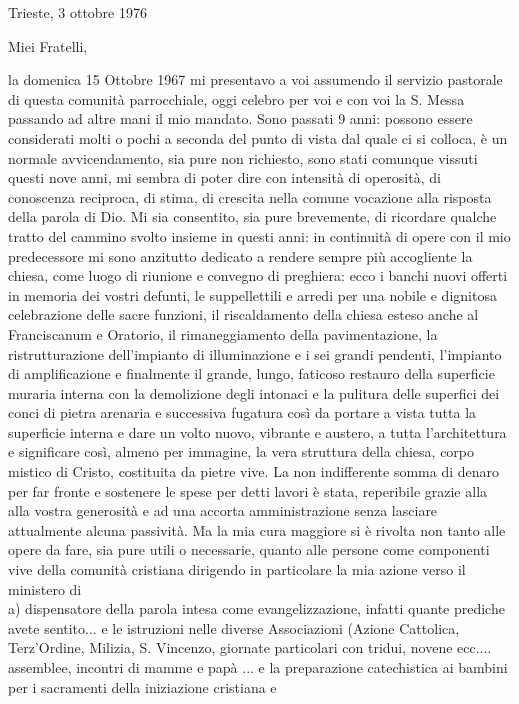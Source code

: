 \begin{flushright}
Trieste, 3 ottobre 1976
\end{flushright}
Miei Fratelli,\par
la domenica 15 Ottobre 1967 mi presentavo a voi assumendo il servizio pastorale di questa comunità parrocchiale, oggi celebro per voi e con voi la S. Messa passando ad altre mani il mio mandato.
Sono passati 9 anni: possono essere considerati molti o pochi a seconda del punto di vista dal quale ci si colloca, è un normale avvicendamento, sia pure non richiesto, sono stati comunque vissuti 
questi nove anni, mi sembra di poter dire con intensità di operosità, di conoscenza reciproca, di stima, di crescita nella comune vocazione alla risposta della parola di Dio.
Mi sia consentito, sia pure brevemente, di ricordare qualche tratto del cammino svolto insieme in questi anni:
in continuità di opere con il mio predecessore mi sono anzitutto dedicato a rendere sempre più accogliente la chiesa, come luogo di riunione e convegno di preghiera: 
ecco i banchi nuovi offerti in memoria dei vostri defunti, le suppellettili e arredi per una nobile e dignitosa celebrazione delle sacre funzioni, il riscaldamento della chiesa esteso anche al 
Franciscanum e Oratorio, il rimaneggiamento della pavimentazione, la ristrutturazione dell’impianto di illuminazione e i sei grandi pendenti, l’impianto di amplificazione e finalmente
il grande, lungo, faticoso restauro della superficie muraria interna con la demolizione degli intonaci e la pulitura delle superfici dei conci di pietra arenaria e successiva fugatura così
da portare a vista tutta la superficie interna e dare un volto nuovo, vibrante e austero, a tutta l'architettura e significare così, almeno per immagine, la vera struttura della chiesa, corpo
mistico di Cristo, costituita da pietre vive.
La non indifferente somma di denaro per far fronte e sostenere le spese per detti lavori è stata, reperibile grazie alla alla vostra generosità e ad una accorta amministrazione senza lasciare
attualmente alcuna passività.
Ma la mia cura maggiore si è rivolta non tanto alle opere da fare, sia pure utili o necessarie, quanto alle persone come componenti vive della comunità cristiana dirigendo in particolare 
la mia azione verso il ministero di\\
a) dispensatore della parola intesa come evangelizzazione, infatti quante prediche avete sentito... e le istruzioni nelle diverse Associazioni (Azione Cattolica, Terz'Ordine, Milizia, 
S. Vincenzo, giornate particolari con tridui, novene ecc.... assemblee, incontri di mamme e papà ... e la preparazione catechistica ai bambini per i sacramenti della iniziazione cristiana e 
